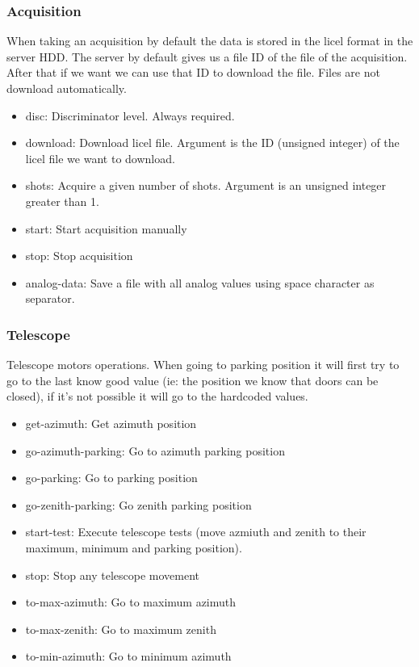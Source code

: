\documentclass[letterpaper, 10 pt]{article}
\begin{document}
\subsubsection{Acquisition}
When taking an acquisition by default the data is stored in the licel format in the server HDD. The server by default gives us a file ID of the file of the acquisition. After that if we want we can use that ID to download the file. Files are not download automatically.
\begin{itemize}
	\item disc: Discriminator level. Always required.
	\item download: Download licel file. Argument is the ID (unsigned integer) of the licel file we want to download.
	\item shots: Acquire a given number of shots. Argument is an unsigned integer greater than 1. 
	\item start: Start acquisition manually
	\item stop: Stop acquisition
	\item analog-data: Save a file with all analog values using space character as separator.
\end{itemize}
\subsubsection{Telescope}
Telescope motors operations. When going to parking position it will first try to go to the last know good value (ie: the position we know that doors can be closed), if it's not possible it will go to the hardcoded values.
\begin{itemize}
	\item get-azimuth: Get azimuth position
	\item go-azimuth-parking: Go to azimuth parking position
	\item go-parking: Go to parking position
	\item go-zenith-parking: Go zenith parking position
	\item start-test: Execute telescope tests (move azmiuth and zenith to their maximum, minimum and parking position).
	\item stop: Stop any telescope movement
	\item to-max-azimuth: Go to maximum azimuth
	\item to-max-zenith: Go to maximum zenith
	\item to-min-azimuth: Go to minimum azimuth		
\end{itemize}
\end{document}
